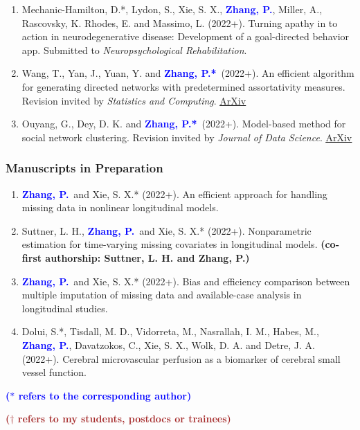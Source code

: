 \documentclass{res}
\newcommand{\PZ}{\textbf{\textcolor{blue}{Zhang, P.*}}}
\newcommand{\PZnot}{\textbf{\textcolor{blue}{Zhang, P.}}}
\begin{document}
\begin{resume}
\begin{enumerate}
	\item {\sc Mechanic-Hamilton, D.*, Lydon, S., Xie, S. X.,} 
	\PZnot, {\sc Miller, A., Rascovsky, K. Rhodes, E.} and {\sc 
	Massimo, L.} (2022+). Turning apathy in to action in 
	neurodegenerative disease: Development of a goal-directed 
	behavior app. Submitted to {\em Neuropsychological 
	Rehabilitation}.
	
	\item {\sc Wang, T., Yan, J., Yuan, Y.} and \PZ\ (2022+). An 
	efficient algorithm for generating directed networks with 
	predetermined assortativity measures. Revision invited by {\em 
	Statistics and Computing}.
	\href{https://arxiv.org/pdf/2201.03451.pdf}{\underline{ArXiv}}
	
	\item {\sc Ouyang, G., Dey, D. K.} and \PZ\ (2022+). 
	Model-based method for social network clustering. Revision 
	invited by {\em Journal of Data Science}. 
	\href{https://arxiv.org/pdf/1708.07604.pdf}{\underline{ArXiv}}
\end{enumerate}

\subsubsection{Manuscripts in Preparation}
\begin{enumerate}
	\item \PZnot\ and {\sc Xie, S. X.*} (2022+). An efficient 
	approach for handling missing data in nonlinear longitudinal
	models.	
	\item {\sc Suttner, L. H.,} \PZnot\ and {\sc Xie, S. X.*} 
	(2022+). Nonparametric estimation for time-varying missing 
	covariates in longitudinal models.  {\bf \small (co-first 
	authorship: Suttner, 
	L. H. and Zhang, P.)}
	\item \PZnot\ and {\sc Xie, S. X.*} (2022+). Bias 
	and efficiency comparison between multiple imputation of missing 
	data and available-case analysis in longitudinal studies. 
	\item {\sc Dolui, S.*, Tisdall, M. D., Vidorreta, M., 
	Nasrallah, I. M., Habes, M.}, \PZnot, {\sc 
	Davatzokos, C., Xie, S. X., Wolk, D. A.} and {\sc Detre, J. A.} 
	(2022+). Cerebral microvascular perfusion as a biomarker of 
	cerebral small vessel function.
\end{enumerate}

{\bf \textcolor{blue}{($\ast$ refers to the corresponding author)}}

{\bf \textcolor{brown}{($\dagger$ refers to my students, postdocs 
or trainees)}}


\end{resume}
\end{document}
